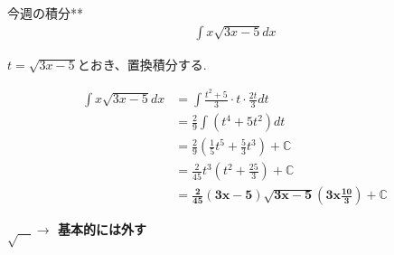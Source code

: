 \documentclass[main]{subfiles}
\begin{document}

\begin{mondai}{7}{今週の積分}{**}
    \begin{align*}
        \int x\sqrt{3x-5}dx
    \end{align*}
\end{mondai}


\solutionhead
\hfill
$t=\sqrt{3x-5}$とおき、置換積分する.
\hfill\

\begin{align*}
    \int x\sqrt{3x-5}dx
        &= \int\frac{t^2+5}{3}\cdot t\cdot \frac{2t}{3}dt \\
        &= \frac{2}{9}\int\left(t^4+5t^2\right)dt \\
        &= \frac{2}{9}\left(\frac{1}{5}t^5+\frac{5}{3}t^3\right)+\mathbb{C} \\
        &= \frac{2}{45}t^3\left(t^2+\frac{25}{3}\right)+\mathbb{C} \\
        &= \boldsymbol{\frac{2}{45}\left(3x-5\right)\sqrt{3x-5}\left(3x\frac{10}{3}\right)+\mathbb{C}}
\end{align*}

\begin{focusbox}
\centering
\textbf{$\sqrt{\quad}\rightarrow$  基本的には外す}
\end{focusbox}
\end{document}

